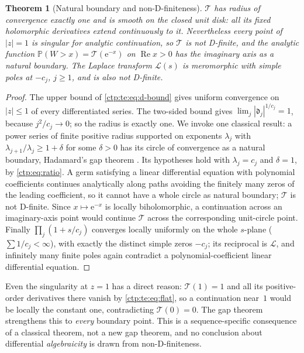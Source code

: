 \documentclass[11pt,a4paper]{article}
\numberwithin{equation}{section}
\newtheorem{theorem}{Theorem}[section]
\theoremstyle{definition}
\theoremstyle{remark}
\newcommand{\e}{\mathrm e}
\newcommand{\PP}{\mathbb P}
\DeclareMathOperator{\Rea}{Re}
\newcommand{\LW}{\mathcal L}
\newcommand{\sd}{\mathfrak d}
\begin{document}
\begin{theorem}[Natural boundary and non-D-finiteness]\label{ctp:te:thm:boundary}
$\mathcal T$ has radius of convergence exactly one and is smooth on the
closed unit disk: all its fixed holomorphic derivatives extend continuously
to it. Nevertheless every point of $|z|=1$ is singular for analytic
continuation, so $\mathcal T$ is not D-finite, and the analytic function
$\PP(W>x)=\mathcal T(\e^{-x})$ on $\Rea x>0$ has the imaginary axis as a
natural boundary. The Laplace transform $\LW(s)$ is meromorphic with simple
poles at $-c_j$, $j\ge1$, and is also not D-finite.
\end{theorem}
\begin{proof}
The upper bound of \eqref{ctp:te:eq:d-bound} gives uniform convergence on
$|z|\le1$ of every differentiated series. The two-sided bound gives
$\lim_j|\sd_j|^{1/c_j}=1$, because $j^2/c_j\to0$; so the radius is exactly
one. We invoke one classical result: a power series of finite positive
radius supported on exponents $\lambda_j$ with $\lambda_{j+1}/\lambda_j\ge1+\delta$
for some $\delta>0$ has its circle of convergence as a natural boundary,
Hadamard's gap theorem \cite[\S13, pp.~116--117]{hadamard}. Its hypotheses
hold with $\lambda_j=c_j$ and $\delta=1$, by \eqref{ctp:eq:ratio}. A germ
satisfying a linear differential equation with polynomial coefficients
continues analytically along paths avoiding the finitely many zeros of the
leading coefficient, so it cannot have a whole circle as natural boundary;
$\mathcal T$ is not D-finite. Since $x\mapsto\e^{-x}$ is locally biholomorphic,
a continuation across an imaginary-axis point would continue $\mathcal T$
across the corresponding unit-circle point. Finally $\prod_j(1+s/c_j)$
converges locally uniformly on the whole $s$-plane ($\sum1/c_j<\infty$), with
exactly the distinct simple zeros $-c_j$; its reciprocal is $\LW$, and
infinitely many finite poles again contradict a polynomial-coefficient
linear differential equation.
\end{proof}

Even the singularity at $z=1$ has a direct reason: $\mathcal T(1)=1$ and all
its positive-order derivatives there vanish by \eqref{ctp:te:eq:flat}, so a
continuation near~$1$ would be locally the constant one, contradicting
$\mathcal T(0)=0$. The gap theorem strengthens this to \emph{every} boundary
point. This is a sequence-specific consequence of a classical theorem, not a
new gap theorem, and no conclusion about differential \emph{algebraicity}
is drawn from non-D-finiteness.
\end{document}
